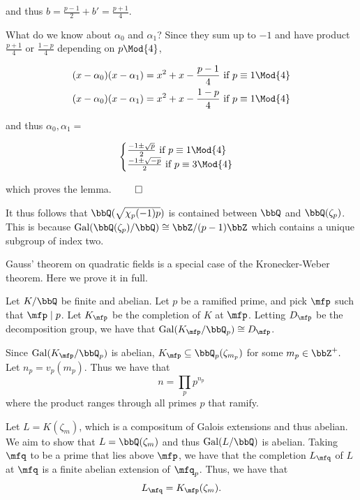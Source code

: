 \documentclass[a4paper, 12pt,oneside,openany]{book}
\begin{document}
and thus $b = \frac{p-1}{2}+b'=\frac{p+1}{4}.$ 

What do we know about $\alpha_0$ and $\alpha_1$? Since they sum up to $-1$ and have product $\frac{p+1}{4}$ or $\frac{1-p}{4}$ depending on $p \Mod{4}$,

\begin{align*}
	(x-\alpha_0)(x-\alpha_1) &= x^2+x-\frac{p-1}{4}\ \text{if}\ p\equiv 1 \Mod{4}\\
	(x-\alpha_0)(x-\alpha_1) &= x^2+x-\frac{1-p}{4}\ \text{if}\ p\equiv 1 \Mod{4}
\end{align*}

and thus $\alpha_0, \alpha_1 = $

$$\begin{cases} 
	\frac{-1\pm \sqrt{p}}{2}\ \text{if}\ p\equiv 1 \Mod{4} \\ 
	\frac{-1\pm \sqrt{-p}}{2}\ \text{if}\ p\equiv 3 \Mod{4}
\end{cases}$$

which proves the lemma. $\qed$

It thus follows that $\bbQ(\sqrt{\chi_p(-1)p})$ is contained between $\bbQ$ and $\bbQ(\zeta_p)$. This is because $\text{Gal}(\bbQ(\zeta_p)/\bbQ) \cong \bbZ/(p-1)\bbZ$ which contains a unique subgroup of index two.

Gauss' theorem on quadratic fields is a special case of the Kronecker-Weber theorem. Here we prove it in full.


 Let $K/\bbQ$ be finite and abelian. Let $p$ be a ramified prime, and pick $\mfp$ such that $\mfp \mid p$. Let $K_\mfp$ be the completion of $K$ at $\mfp$. Letting $D_\mfp$ be the decomposition group, we have that $\text{Gal}(K_\mfp / \bbQ_p) \cong D_\mfp$.

Since $\text{Gal}(K_\mfp / \bbQ_p)$ is abelian, $K_\mfp \subseteq \bbQ_p (\zeta_{m_p})$ for some $m_p \in \bbZ^+.$ Let $n_p = v_p(m_p)$. Thus we have that $$n = \prod\limits_p p^{n_p}$$ where the product ranges through all primes $p$ that ramify. 

Let $L=K(\zeta_m)$, which is a compositum of Galois extensions and thus abelian. We aim to show that $L = \bbQ(\zeta_m)$ and thus $\text{Gal}(L/\bbQ)$ is abelian. Taking $\mfq$ to be a prime that lies above $\mfp$, we have that the completion $L_\mfq$ of $L$ at $\mfq$ is a finite abelian extension of $\mfq_p$. Thus, we have that $$L_\mfq = K_\mfp(\zeta_m).$$
\end{document}

